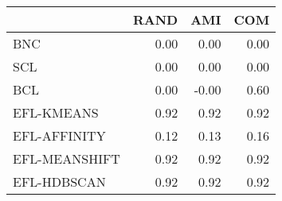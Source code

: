\begin{tabular}{lrrr}
\toprule
 & RAND & AMI & COM \\
\midrule
BNC & 0.00 & 0.00 & 0.00 \\
SCL & 0.00 & 0.00 & 0.00 \\
BCL & 0.00 & -0.00 & 0.60 \\
EFL-KMEANS & 0.92 & 0.92 & 0.92 \\
EFL-AFFINITY & 0.12 & 0.13 & 0.16 \\
EFL-MEANSHIFT & 0.92 & 0.92 & 0.92 \\
EFL-HDBSCAN & 0.92 & 0.92 & 0.92 \\
\bottomrule
\end{tabular}
